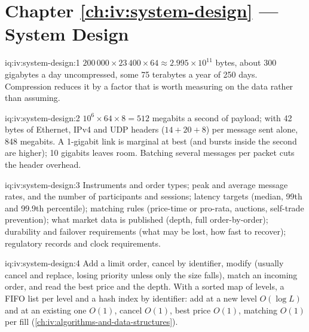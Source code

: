 \section*{Chapter \ref{ch:iv:system-design} --- System Design}

\begin{solution}{iq:iv:system-design:1}
$200\,000 \times 23\,400 \times 64 \approx 2.995 \times 10^{11}$ bytes, about 300 gigabytes a day uncompressed, some 75
terabytes a year of 250 days. Compression reduces it by a factor that is worth measuring on the data
rather than assuming.
\end{solution}

\begin{solution}{iq:iv:system-design:2}
$10^6 \times 64 \times 8 = 512$ megabits a second of payload; with 42 bytes of Ethernet, IPv4 and UDP headers ($14 + 20 + 8$) per
message sent alone, 848 megabits. A 1-gigabit link is marginal at best (and bursts inside the second are higher); 10 gigabits leaves room. Batching
several messages per packet cuts the header overhead.
\end{solution}

\begin{solution}{iq:iv:system-design:3}
Instruments and order types; peak and average message rates, and the number of participants and sessions; latency targets (median,
99th and 99.9th percentile); matching rules (price-time or pro-rata, auctions, self-trade prevention); what market data is published
(depth, full order-by-order); durability and failover requirements (what may be lost, how fast to recover); regulatory records and
clock requirements.
\end{solution}

\begin{solution}{iq:iv:system-design:4}
Add a limit order, cancel by identifier, modify (usually cancel and replace, losing priority unless only the size falls), match an
incoming order, and read the best price and the depth. With a sorted map of levels, a FIFO list per level and a hash index by
identifier: add at a new level $O(\log L)$ and at an existing one $O(1)$, cancel $O(1)$, best price $O(1)$, matching $O(1)$ per fill
(\cref{ch:iv:algorithms-and-data-structures}).
\end{solution}


